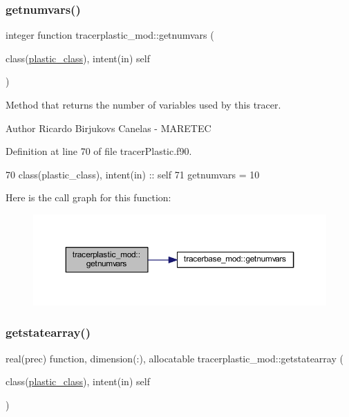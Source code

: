 \subsubsection{\texorpdfstring{getnumvars()}{getnumvars()}}
{\footnotesize\ttfamily integer function tracerplastic\+\_\+mod\+::getnumvars (\begin{DoxyParamCaption}\item[{class(\mbox{\hyperlink{structtracerplastic__mod_1_1plastic__class}{plastic\+\_\+class}}), intent(in)}]{self }\end{DoxyParamCaption})\hspace{0.3cm}{\ttfamily [private]}}



Method that returns the number of variables used by this tracer. 

\begin{DoxyAuthor}{Author}
Ricardo Birjukovs Canelas -\/ M\+A\+R\+E\+T\+EC 
\end{DoxyAuthor}


Definition at line 70 of file tracer\+Plastic.\+f90.


\begin{DoxyCode}
70     \textcolor{keywordtype}{class}(plastic\_class), \textcolor{keywordtype}{intent(in)} :: self
71     getnumvars = 10
\end{DoxyCode}
Here is the call graph for this function\+:\nopagebreak
\begin{figure}[H]
\begin{center}
\leavevmode
\includegraphics[width=350pt]{namespacetracerplastic__mod_aa5367c2562d10b5393f263394f07fa49_cgraph}
\end{center}
\end{figure}
\mbox{\label{namespacetracerplastic__mod_aa8cdd2196261b216dd6cdd5b7ef2fe90}} 
\subsubsection{\texorpdfstring{getstatearray()}{getstatearray()}}
{\footnotesize\ttfamily real(prec) function, dimension(\+:), allocatable tracerplastic\+\_\+mod\+::getstatearray (\begin{DoxyParamCaption}\item[{class(\mbox{\hyperlink{structtracerplastic__mod_1_1plastic__class}{plastic\+\_\+class}}), intent(in)}]{self }\end{DoxyParamCaption})\hspace{0.3cm}{\ttfamily [private]}}



